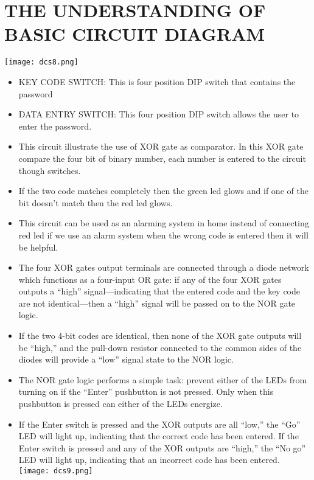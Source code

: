 \documentclass{article}
\begin{document}
\section{THE UNDERSTANDING OF BASIC CIRCUIT DIAGRAM}
\texttt{[image: dcs8.png]}
\begin{itemize}
\item KEY CODE SWITCH: This is four position DIP switch that contains the password
\item DATA ENTRY SWITCH: This four position DIP switch allows the user to enter the password.
\item This circuit illustrate the use of XOR gate as comparator. In this XOR gate compare the four bit of binary number, each number is entered to the circuit though switches.
\item If the two code matches completely then the green led glows and if one of the bit doesn't match then the  red led glows.
\item This circuit can be used as an alarming system in home instead of connecting red led if we use an alarm system when the wrong code is entered then it will be helpful.
\item The four XOR gates output terminals are connected through a diode network which functions as a four-input OR gate: if any of the four XOR gates outputs a “high” signal—indicating that the entered code and the key code are not identical—then a “high” signal will be passed on to the NOR gate logic.
\item If the two 4-bit codes are identical, then none of the XOR gate outputs will be “high,” and the pull-down resistor connected to the common sides of the diodes will provide a “low” signal state to the NOR logic. 
\item The NOR gate logic performs a simple task: prevent either of the LEDs from turning on if the “Enter” pushbutton is not pressed. Only when this pushbutton is pressed can either of the LEDs energize.
\item If the Enter switch is pressed and the XOR outputs are all “low,” the “Go” LED will light up, indicating that the correct code has been entered. If the Enter switch is pressed and any of the XOR outputs are “high,” the “No go” LED will light up, indicating that an incorrect code has been entered.
\center
\texttt{[image: dcs9.png]}
\end{itemize}
\end{document}
